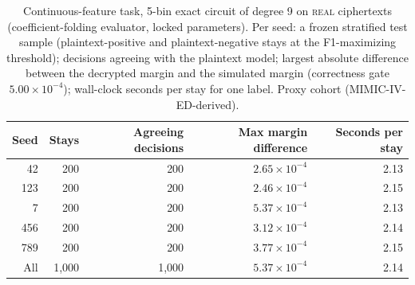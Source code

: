 \begin{table}[t]
\centering
\caption{Continuous-feature task, 5-bin exact circuit of degree 9 on \textsc{real} ciphertexts (coefficient-folding evaluator, locked parameters). Per seed: a frozen stratified test sample (plaintext-positive and plaintext-negative stays at the F1-maximizing threshold); decisions agreeing with the plaintext model; largest absolute difference between the decrypted margin and the simulated margin (correctness gate $5.00 \times 10^{-4}$); wall-clock seconds per stay for one label. Proxy cohort (MIMIC-IV-ED-derived).}
\label{tab:t13_continuous_real}
\begin{tabular}{rrrrr}
\toprule
Seed & Stays & Agreeing decisions & Max margin difference & Seconds per stay \\
\midrule
42 & 200 & 200 & $2.65 \times 10^{-4}$ & 2.13 \\
123 & 200 & 200 & $2.46 \times 10^{-4}$ & 2.15 \\
7 & 200 & 200 & $5.37 \times 10^{-4}$ & 2.13 \\
456 & 200 & 200 & $3.12 \times 10^{-4}$ & 2.14 \\
789 & 200 & 200 & $3.77 \times 10^{-4}$ & 2.15 \\
\midrule
All & 1,000 & 1,000 & $5.37 \times 10^{-4}$ & 2.14 \\
\bottomrule
\end{tabular}
\end{table}
